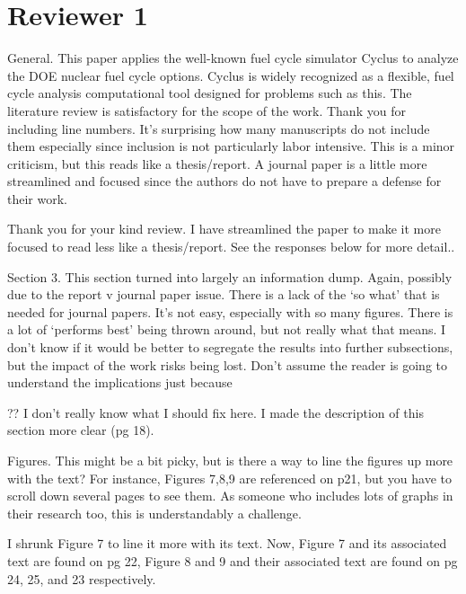 \documentclass[answers,11pt]{exam}
\begin{document}
\section*{Reviewer 1}
\begin{questions}

\question General. This paper applies the well-known fuel cycle simulator Cyclus to analyze the DOE nuclear
fuel cycle options. Cyclus is widely recognized as a flexible, fuel cycle analysis computational tool designed for problems such as this. The literature review is satisfactory for the scope of the work. Thank
you for including line numbers. It’s surprising how many manuscripts do not include them especially
since inclusion is not particularly labor intensive. This is a minor criticism, but this reads like a thesis/report. A journal paper is a little more streamlined and focused since the authors do not have to
prepare a defense for their work.

\begin{solution}
        Thank you for your kind review.
        I have streamlined the paper to make it more focused to read less like a thesis/report. 
        See the responses below for more detail..
\end{solution}

\question Section 3. This section turned into largely an information dump. Again, possibly due to the report v
journal paper issue. There is a lack of the ‘so what’ that is needed for journal papers. It’s not easy,
especially with so many figures. There is a lot of ‘performs best’ being thrown around, but not really
what that means. I don’t know if it would be better to segregate the results into further subsections, but
the impact of the work risks being lost. Don’t assume the reader is going to understand the implications
just because

\begin{solution}
?? I don't really know what I should fix here. I made the description of this section more 
clear (pg 18).
\end{solution}

\question Figures. This might be a bit picky, but is there a way to line the figures up more with the text? For
instance, Figures 7,8,9 are referenced on p21, but you have to scroll down several pages to see them. As
someone who includes lots of graphs in their research too, this is understandably a challenge.

\begin{solution}
I shrunk Figure 7 to line it more with its text. Now, Figure 7 and its associated text are 
found on pg 22, Figure 8 and 9 and their associated text are found on pg 24, 25, and 23 
respectively. 
\end{solution}


\end{questions}
\end{document}
